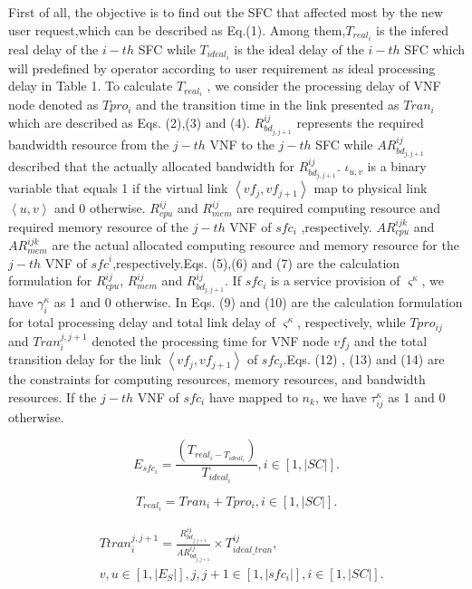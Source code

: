 \documentclass{ieeeaccess}
\begin{document}
First of all, the objective is to find out the SFC that affected most by the new user request,which can be described as Eq.(1). Among them,$T_{real_{i}}$ is the infered real delay of the $i-th$ SFC while $T_{ideal_{i}}$ is the ideal delay of the ${i-th}$ SFC which will  predefined by operator according to user requirement as ideal processing delay in Table 1. To calculate $T_{real_{i}}$ , we  consider the processing delay of VNF node denoted as $Tpro_{i}$ and the transition time in the link presented as $Tran_{i}$ which are described as Eqs. (2),(3) and (4). $R_{bd_{j,j+1}}^{ij}$ represents the required bandwidth resource from the $j-th$ VNF to the $j-th$ SFC while $AR_{bd_{j,j+1}}^{ij}$ described that the actually allocated bandwidth for $R_{bd_{j,j+1}}^{ij}$. $\iota _{u,v}$ is a binary variable that equals 1 if the virtual link $\left \langle vf_{j},vf_{j+1} \right \rangle$ map to physical link  $\left \langle u,v \right \rangle$ and 0 otherwise.
$R_{cpu}^{ij}$ and $R_{mem}^{ij}$ are required computing resource and required memory resource of the ${j-th}$ VNF of ${sfc}_{i}$ ,respectively. $AR_{cpu}^{ijk}$ and $AR_{mem}^{ijk}$ are the actual allocated computing resource and memory resource for the $j-th$ VNF of  ${sfc}^{i}$,respectively.Eqs. (5),(6) and (7) are the calculation formulation for $R_{cpu}^{ij}$, $R_{mem}^{ij}$ and $R_{bd_{j,j+1}}^{ij}$. If $sfc_{i}$ is a service provision of ${\varsigma}^{\kappa}$, we have $\gamma _{i}^{\kappa}$ as 1 and 0 otherwise. In Eqs. (9) and (10) are the calculation formulation for total processing delay and total link delay of ${\varsigma}^{\kappa}$, respectively, while $Tpro_{ij}$ and $Tran_{i}^{j,j+1}$ denoted the processing time for VNF node $vf_{j}$ and  the total transition delay for the link $\left \langle vf_{j},vf_{j+1} \right \rangle$ of $sfc_{i}$.Eqs. (12) , (13) and (14)  are the constraints for computing resources, memory resources, and bandwidth resources. If the $j-th$  VNF of $sfc_{i}$ have mapped to $n_{k}$, we have $\tau _{ij}^{\kappa}$ as 1 and 0 otherwise.

\begin{equation}E_{sfc_{i}}=\frac{\left ( T_{real_{i}-T_{ideal_{i}}} \right )}{T_{ideal_{i}}},i \in \left [ 1,|SC| \right ].\label{eq1}
\end{equation}

\begin{equation}
T_{real_{i}}  =Tran_{i}+Tpro_{i},i \in \left [ 1,|SC| \right ].
\end{equation}

\begin{equation}
\begin{aligned}
&Ttran_{i}^{j,j+1}=\frac{R_{bd_{j,j+1}}^{ij}}{AR_{bd_{j,j+1}}^{ij}}\times T_{ideal\_tran}^{ij},\\
&v,u \in \left [ 1,|E_{S}| \right ],j,j+1 \in \left [ 1,|sfc_{i}| \right ],i \in \left [ 1,|SC| \right ].\label{eq}
\end{aligned}
\end{equation}
\end{document}
